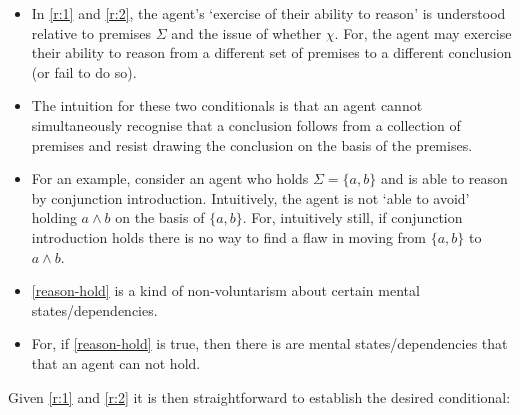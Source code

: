 \documentclass[10pt]{article}
\begin{document}
\begin{itemize}
\item In \ref{r:1} and \ref{r:2}, the agent's `exercise of their ability to reason' is understood relative to premises \(\Sigma\) and the issue of whether \(\chi\).
For, the agent may exercise their ability to reason from a different set of premises to a different conclusion (or fail to do so).
\item The intuition for these two conditionals is that an agent cannot simultaneously recognise that a conclusion follows from a collection of premises and resist drawing the conclusion on the basis of the premises.
\item For an example, consider an agent who holds \(\Sigma = \{a,b\}\) and is able to reason by conjunction introduction.
  Intuitively, the agent is not `able to avoid' holding \(a \land b\) on the basis of \(\{a,b\}\).
  For, intuitively still, if conjunction introduction holds there is no way to find a flaw in moving from \(\{a,b\}\) to \(a \land b\).
\end{itemize}

\begin{itemize}
\item \ref{reason-hold} is a kind of non-voluntarism about certain mental states/dependencies.
\item For, if \ref{reason-hold} is true, then there is are mental states/dependencies that that an agent can not hold.
\end{itemize}

\newpage

Given \ref{r:1} and \ref{r:2} it is then straightforward to establish the desired conditional:
\end{document}
